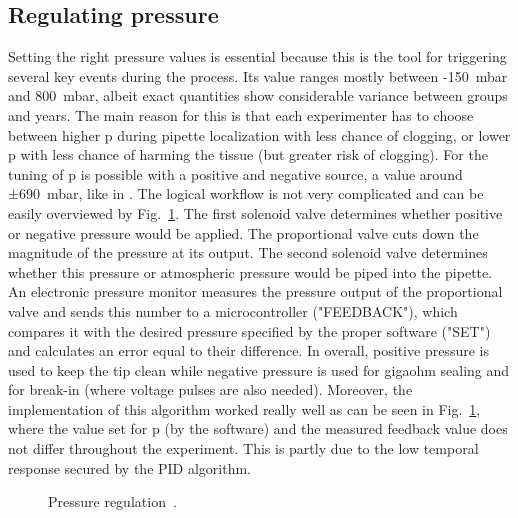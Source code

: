 \documentclass[12pt,a4paper]{report}
\begin{document}
\subsection{Regulating pressure}

Setting the right pressure values is essential because this is the tool for triggering several key events during the process. Its value ranges mostly between -150~mbar and 800~mbar, albeit exact quantities show considerable variance between groups and years. The main reason for this is that each experimenter has to choose between higher p during pipette localization with less chance of clogging, or lower p with less chance of harming the tissue (but greater risk of clogging). For the tuning of p is possible with a positive and negative source, a value around ±690~mbar, like in \cite{desai2015}. The logical workflow is not very complicated and can be easily overviewed by Fig.~\ref{fig:pFeedback}. The first solenoid valve determines whether positive or negative pressure would be applied. The proportional valve cuts down the magnitude of the pressure at its output. The second solenoid valve determines whether this pressure or atmospheric pressure would be piped into the pipette. An electronic pressure monitor measures the pressure output of the proportional valve and sends this number to a microcontroller ("FEEDBACK"), which compares it with the desired pressure specified by the proper software ("SET") and calculates an error equal to their difference. In overall, positive pressure is used to keep the tip clean while negative pressure is used for gigaohm sealing and for break-in (where voltage pulses are also needed). Moreover, the implementation of this algorithm worked really well as can be seen in Fig.~\ref{fig:pFeedback}, where the value set for p (by the software) and the measured feedback value does not differ throughout the experiment. This is partly due to the low temporal response secured by the PID algorithm.
\begin{figure}
    \centering
    \caption{Pressure regulation~\cite{desai2015}.}
    \label{fig:pFeedback}
\end{figure}
\end{document}
